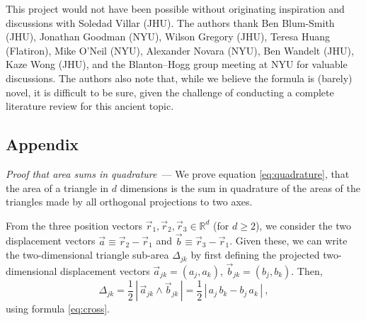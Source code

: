 \documentclass[10pt]{article}
\renewcommand{\paragraph}[1]{\par\addvspace{1.5ex}\noindent\textsl{#1}~---}
\newcommand{\secbreak}{\bigskip{\centering\footnotesize $\triangle~~~\triangle~~~\triangle$\par}\bigskip\noindent}
\newcommand{\abs}[1]{|\,{#1}\,|}
\begin{document}
{\footnotesize\par\bigskip\noindent
This project would not have been possible without originating inspiration and discussions with Soledad Villar (JHU).
The authors thank Ben Blum-Smith (JHU), Jonathan Goodman (NYU), Wilson Gregory (JHU), Teresa Huang (Flatiron), Mike O'Neil (NYU), Alexander Novara (NYU), Ben Wandelt (JHU), Kaze Wong (JHU), and the Blanton--Hogg group meeting at NYU for valuable discussions.
The authors also note that, while we believe the formula is (barely) novel, it is difficult to be sure, given the challenge of conducting a complete literature review for this ancient topic.\par}

\secbreak

\vspace{-\bigskipamount}
\renewcommand{\section}[2]{}%
{\small\singlespacing\par}

\secbreak
\appendix
\subsection{Appendix}
\label{sec:appendix}

\paragraph{Proof that area sums in quadrature} We prove equation \eqref{eq:quadrature}, that the area of a triangle in $d$ dimensions is the sum in quadrature of the areas of the triangles made by all orthogonal projections to two axes.

From the three position vectors $\vec{r}_1, \vec{r}_2, \vec{r}_3 \in \mathbb{R}^d$ (for $d \geq 2$), we consider the two displacement vectors $\vec{a} \equiv \vec{r}_2 - \vec{r}_1$ and $\vec{b} \equiv \vec{r}_3 - \vec{r}_1$.
Given these, we can write the two-dimensional triangle sub-area $\Delta_{jk}$ by first defining the projected two-dimensional displacement vectors $\vec{a}_{jk} = ( a_j, a_k )$, $\vec{b}_{jk} = ( b_j, b_k )$. Then,
\begin{equation}
    \Delta_{jk}
    = \frac{1}{2} \, \abs{ \vec{a}_{jk} \wedge \vec{b}_{jk} }
    = \frac{1}{2}
        \, \abs{a_j \, b_k - b_j \, a_k}~,
\end{equation}
using formula \eqref{eq:cross}.
\end{document}
